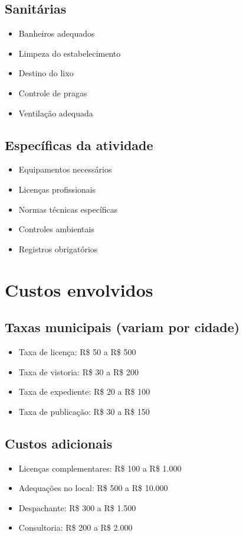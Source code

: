 \documentclass[12pt,a4paper]{article}
\begin{document}
\subsection{Sanitárias}
\begin{itemize}
    \item Banheiros adequados
    \item Limpeza do estabelecimento
    \item Destino do lixo
    \item Controle de pragas
    \item Ventilação adequada
\end{itemize}

\subsection{Específicas da atividade}
\begin{itemize}
    \item Equipamentos necessários
    \item Licenças profissionais
    \item Normas técnicas específicas
    \item Controles ambientais
    \item Registros obrigatórios
\end{itemize}

\section{Custos envolvidos}

\subsection{Taxas municipais (variam por cidade)}
\begin{itemize}
    \item Taxa de licença: R\$ 50 a R\$ 500
    \item Taxa de vistoria: R\$ 30 a R\$ 200
    \item Taxa de expediente: R\$ 20 a R\$ 100
    \item Taxa de publicação: R\$ 30 a R\$ 150
\end{itemize}

\subsection{Custos adicionais}
\begin{itemize}
    \item Licenças complementares: R\$ 100 a R\$ 1.000
    \item Adequações no local: R\$ 500 a R\$ 10.000
    \item Despachante: R\$ 300 a R\$ 1.500
    \item Consultoria: R\$ 200 a R\$ 2.000
\end{itemize}
\end{document}
